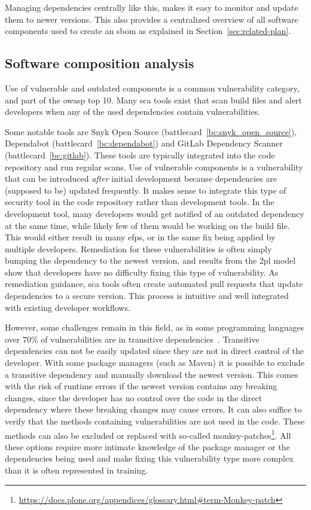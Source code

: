 Managing dependencies centrally like this, makes it easy to monitor and update them to newer versions.
This also provides a centralized overview of all software components used to create an \gls{sbom} as explained in Section~\ref{sec:related-plan}.

\subsection{Software composition analysis}
Use of vulnerable and outdated components is a common vulnerability category, and part of the \gls{owasp} top 10.
Many \gls{sca} tools exist that scan build files and alert developers when any of the used dependencies contain vulnerabilities.

Some notable tools are Snyk Open Source (battlecard~\ref{bc:snyk_open_source}), Dependabot (battlecard~\ref{bc:dependabot}) and GitLab Dependency Scanner (battlecard~\ref{bc:gitlab}).
These tools are typically integrated into the code repository and run regular scans.
Use of vulnerable components is a vulnerability that can be introduced \textit{after} initial development because dependencies are (supposed to be) updated frequently.
It makes sense to integrate this type of security tool in the code repository rather than development tools.
In the development tool, many developers would get notified of an outdated dependency at the same time, while likely few of them would be working on the build file.
This would either result in many \glspl{efp}, or in the same fix being applied by multiple developers.
Remediation for these vulnerabilities is often simply bumping the dependency to the newest version, and results from the \gls{2pl} model show that developers have no difficulty fixing this type of vulnerability.
As remediation guidance, \gls{sca} tools often create automated pull requests that update dependencies to a secure version.
This process is intuitive and well integrated with existing developer workflows.

However, some challenges remain in this field, as in some programming languages over 70\% of vulnerabilities are in transitive dependencies~\cite{snyk2020}.
Transitive dependencies can not be easily updated since they are not in direct control of the developer.
With some package managers (such as Maven) it is possible to exclude a transitive dependency and manually download the newest version.
This comes with the risk of runtime errors if the newest version contains any breaking changes, since the developer has no control over the code in the direct dependency where these breaking changes may cause errors.
It can also suffice to verify that the methods containing vulnerabilities are not used in the code.
These methods can also be excluded or replaced with so-called monkey-patches\footnote{\url{https://docs.plone.org/appendices/glossary.html\#term-Monkey-patch}}.
All these options require more intimate knowledge of the package manager or the dependencies being used and make fixing this vulnerability type more complex than it is often represented in training.